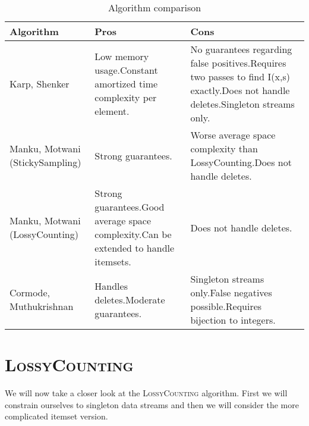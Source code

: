 \documentclass[a4paper]{article}
\begin{document}
\begin{table}
{\scriptsize 
\begin{tabulary}{1\textwidth}{LLL}
\hline \textbf{Algorithm}  %
& \textbf{Pros} & \textbf{Cons} \\ 
\hline Karp, Shenker %
& Low memory usage.\newline Constant amortized time complexity per element. & No guarantees regarding false positives.\newline Requires two passes to find I(x,s) exactly.\newline Does not handle deletes.\newline Singleton streams only. \\ 
\hline Manku, Motwani (StickySampling) %
& Strong guarantees. & Worse average space complexity than LossyCounting.\newline Does not handle deletes. \\ 
\hline Manku, Motwani (LossyCounting) %
& Strong guarantees.\newline Good average space complexity.\newline Can be extended to handle itemsets.  & Does not handle deletes. \\ 
\hline Cormode, Muthukrishnan  %
& Handles deletes.\newline Moderate guarantees. & Singleton streams only.\newline False negatives possible.\newline Requires bijection to integers. \\ 
\hline 

\end{tabulary}
}
\caption{Algorithm comparison}
\label{ComparisonTable}
\end{table}

\section{\textsc{LossyCounting}}\label{LossyCounting}
We will now take a closer look at the \textsc{LossyCounting} algorithm. First we will constrain ourselves to singleton data streams and then we will consider the more complicated itemset version.
\end{document}
